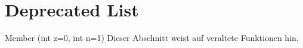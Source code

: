 \chapter{Deprecated List}
\hypertarget{deprecated}{}\label{deprecated}

\begin{DoxyRefList}
\item[Member \doxylink{class_bruch_a05e1f4aae8cd7c722c09d2539f177ce3}{Bruch\+::Bruch} (int z=0, int n=1)]\label{deprecated__deprecated000001}%
%
Dieser Abschnitt weist auf veraltete Funktionen hin.
\end{DoxyRefList}